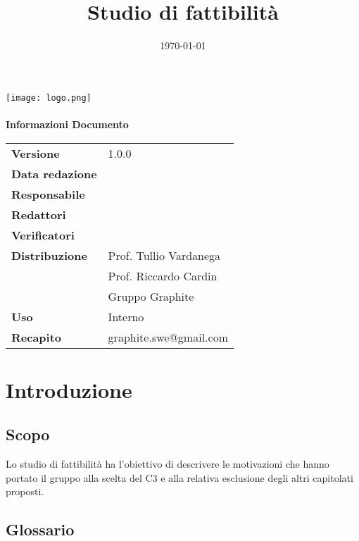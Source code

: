 \documentclass[openany,12pt,a4paper]{report}
\title{Studio di fattibilità}
\author{}
\date{\today}
\begin{document}
	\makeatletter
	\begin{titlepage}
		\setlength{\headsep}{0pt}  
		\begin{center}
			\texttt{[image: logo.png]}\\[1em]
			{\huge \bfseries  \@title }\\[10ex]
			\textbf{\Large Informazioni Documento} \\[2em]
			\bgroup
			\def\arraystretch{1.5}
			\begin{tabular}{l|l}
				\textbf{Versione} & 1.0.0 \\
				\textbf{Data redazione} & \large \@date \\
				\textbf{Responsabile} &  \\
				\textbf{Redattori} &  \\
				\textbf{Verificatori} &  \\
				\textbf{Distribuzione} & Prof. Tullio Vardanega \\
				& Prof. Riccardo Cardin \\
				& Gruppo Graphite \\
				\textbf{Uso} & Interno \\
				\textbf{Recapito} & graphite.swe@gmail.com \\
			\end{tabular}
			\egroup
		\end{center}
	\end{titlepage}
	\makeatother
	
	\thispagestyle{empty}
	\newpage
	
	
	\tableofcontents{}
	
	
	\chapter{Introduzione}
	
	\section{Scopo}
	
	Lo studio di fattibilità ha l’obiettivo di descrivere le motivazioni che hanno portato
	il gruppo alla scelta del   C3 e alla relativa esclusione degli altri capitolati proposti.
	
	\section{Glossario}
	
\end{document}
